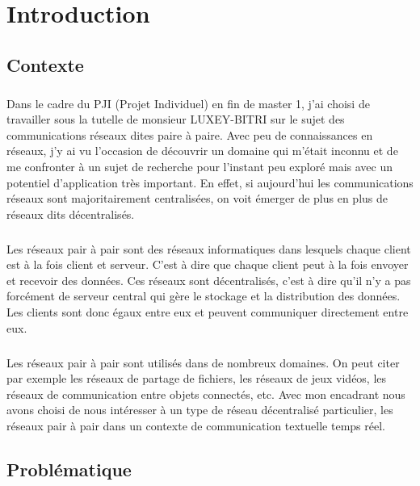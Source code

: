 \chapter{Introduction}

\section{Contexte}

\paragraph{}

Dans le cadre du PJI (Projet Individuel) en fin de master 1, j'ai choisi de travailler sous la tutelle de monsieur LUXEY-BITRI sur le sujet des communications réseaux dites paire à paire.
Avec peu de connaissances en réseaux, j'y ai vu l'occasion de découvrir un domaine qui m'était inconnu et de me confronter à un sujet de recherche pour l'instant peu exploré mais 
avec un potentiel d'application très important. En effet, si aujourd'hui les communications réseaux sont majoritairement centralisées, on voit émerger de plus en plus de réseaux
dits décentralisés. 

\paragraph{}

Les réseaux pair à pair sont des réseaux informatiques dans lesquels chaque client est à la fois client et serveur. C'est à dire que chaque client peut à la fois envoyer et recevoir
des données. Ces réseaux sont décentralisés, c'est à dire qu'il n'y a pas forcément de serveur central qui gère le stockage et la distribution des données. Les clients sont donc
égaux entre eux et peuvent communiquer directement entre eux. 

\paragraph{}

Les réseaux pair à pair sont utilisés dans de nombreux domaines. On peut citer par exemple les réseaux de partage de fichiers, les réseaux de jeux vidéos, les réseaux de communication
entre objets connectés, etc. Avec mon encadrant nous avons choisi de nous intéresser à un type de réseau décentralisé particulier, les réseaux pair à pair dans un contexte de communication 
textuelle temps réel. 


\section{Problématique}

